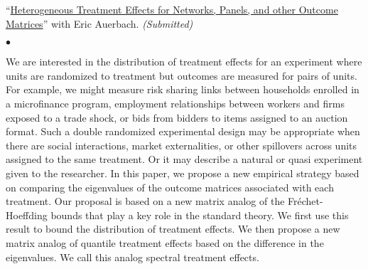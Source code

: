 \documentclass[margin,line]{res}
\newenvironment{list1}{
  \begin{list}{\ding{113}}{%
      \setlength{\itemsep}{.025in}
      \setlength{\parsep}{0in} \setlength{\parskip}{0in}
      \setlength{\topsep}{0in} \setlength{\partopsep}{0in}
      \setlength{\leftmargin}{0.17in}}}{\end{list}}
\newenvironment{list2}{
  \begin{list}{$\bullet$}{%
      \setlength{\itemsep}{0in}
      \setlength{\parsep}{0in} \setlength{\parskip}{0in}
      \setlength{\topsep}{0in} \setlength{\partopsep}{0in}
      \setlength{\leftmargin}{0.2in}}}{\end{list}}
\begin{document}
\begin{resume}
\begin{list1}
	\newpage
	
\item[] ``\href{https://arxiv.org/pdf/2205.01246.pdf}{Heterogeneous Treatment Effects for Networks, Panels, and other Outcome Matrices}'' with Eric Auerbach. \emph{(Submitted)}
	\begin{list2}
		\item[] We are interested in the distribution of treatment effects for an experiment where units are randomized to treatment but outcomes are measured for pairs of units. For example, we might measure risk sharing links between households enrolled in a microfinance program, employment relationships between workers and firms exposed to a trade shock, or bids from bidders to items assigned to an auction format. Such a double randomized experimental design may be appropriate when there are social interactions, market externalities, or other spillovers across units assigned to the same treatment. Or it may describe a natural or quasi experiment given to the researcher. In this paper, we propose a new empirical strategy based on comparing the eigenvalues of the outcome matrices associated with each treatment. Our proposal is based on a new matrix analog of the Fréchet-Hoeffding bounds that play a key role in the standard theory. We first use this result to bound the distribution of treatment effects. We then propose a new matrix analog of quantile treatment effects based on the difference in the eigenvalues. We call this analog spectral treatment effects. \\		
	\end{list2}	
	

\end{list1}
\end{resume}
\end{document}
